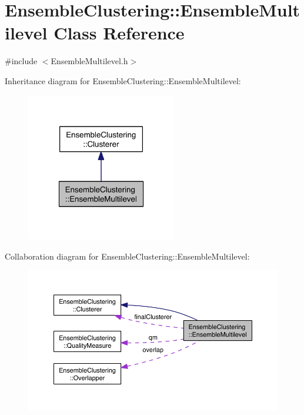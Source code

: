 \hypertarget{class_ensemble_clustering_1_1_ensemble_multilevel}{\section{Ensemble\-Clustering\-:\-:Ensemble\-Multilevel Class Reference}
\label{class_ensemble_clustering_1_1_ensemble_multilevel}
}


{\ttfamily \#include $<$Ensemble\-Multilevel.\-h$>$}



Inheritance diagram for Ensemble\-Clustering\-:\-:Ensemble\-Multilevel\-:
\nopagebreak
\begin{figure}[H]
\begin{center}
\leavevmode
\includegraphics[width=186pt]{class_ensemble_clustering_1_1_ensemble_multilevel__inherit__graph}
\end{center}
\end{figure}


Collaboration diagram for Ensemble\-Clustering\-:\-:Ensemble\-Multilevel\-:
\nopagebreak
\begin{figure}[H]
\begin{center}
\leavevmode
\includegraphics[width=350pt]{class_ensemble_clustering_1_1_ensemble_multilevel__coll__graph}
\end{center}
\end{figure}
